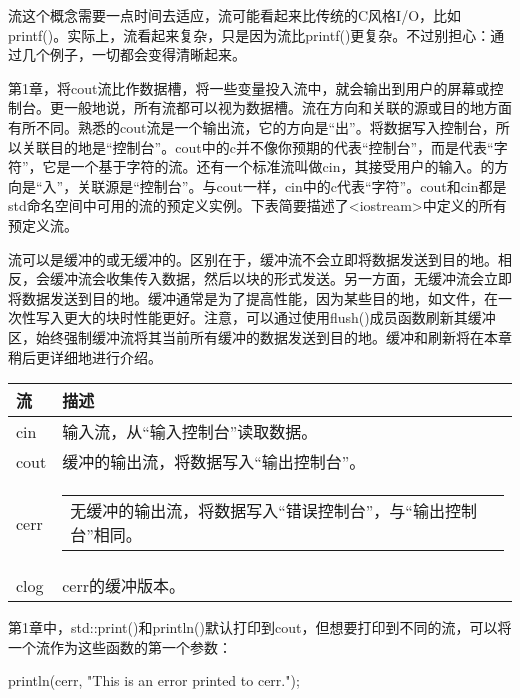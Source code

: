 
流这个概念需要一点时间去适应，流可能看起来比传统的C风格I/O，比如printf()。实际上，流看起来复杂，只是因为流比printf()更复杂。不过别担心：通过几个例子，一切都会变得清晰起来。


第1章，将cout流比作数据槽，将一些变量投入流中，就会输出到用户的屏幕或控制台。更一般地说，所有流都可以视为数据槽。流在方向和关联的源或目的地方面有所不同。熟悉的cout流是一个输出流，它的方向是“出”。将数据写入控制台，所以关联目的地是“控制台”。cout中的c并不像你预期的代表“控制台”，而是代表“字符”，它是一个基于字符的流。还有一个标准流叫做cin，其接受用户的输入。的方向是“入”，关联源是“控制台”。与cout一样，cin中的c代表“字符”。cout和cin都是std命名空间中可用的流的预定义实例。下表简要描述了<iostream>中定义的所有预定义流。

流可以是缓冲的或无缓冲的。区别在于，缓冲流不会立即将数据发送到目的地。相反，会缓冲流会收集传入数据，然后以块的形式发送。另一方面，无缓冲流会立即将数据发送到目的地。缓冲通常是为了提高性能，因为某些目的地，如文件，在一次性写入更大的块时性能更好。注意，可以通过使用flush()成员函数刷新其缓冲区，始终强制缓冲流将其当前所有缓冲的数据发送到目的地。缓冲和刷新将在本章稍后更详细地进行介绍。

\begin{longtable}{|l|l|}
\hline
\textbf{流} & \textbf{描述}                                          \\ \hline
\endfirsthead
%
\endhead
%
cin             & 输入流，从“输入控制台”读取数据。          \\ \hline
cout            & 缓冲的输出流，将数据写入“输出控制台”。
 \\ \hline
cerr & \begin{tabular}[c]{@{}l@{}}无缓冲的输出流，将数据写入“错误控制台”，与“输出控制台”相同。\end{tabular} \\ \hline
clog            & cerr的缓冲版本。                                    \\ \hline
\end{longtable}

第1章中，std::print()和println()默认打印到cout，但想要打印到不同的流，可以将一个流作为这些函数的第一个参数：

\begin{cpp}
println(cerr, "This is an error printed to cerr.");
\end{cpp}

